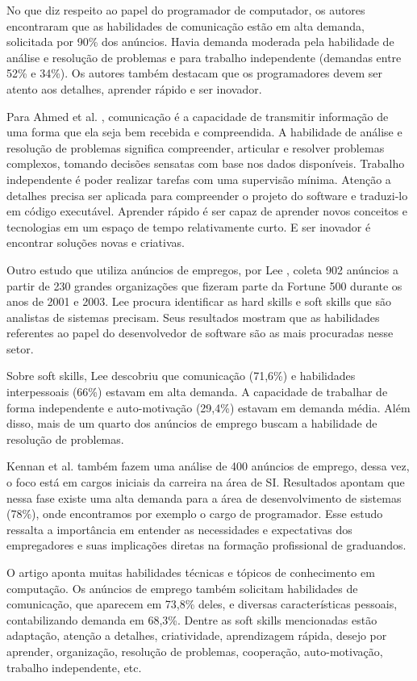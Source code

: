 No que diz respeito ao papel do programador de computador, os autores encontraram que as habilidades de comunicação estão em alta demanda, solicitada por 90\% dos anúncios. Havia demanda moderada pela habilidade de análise e resolução de problemas e para trabalho independente (demandas entre 52\% e 34\%). Os autores também destacam que os programadores devem ser atento aos detalhes, aprender rápido e ser inovador.

Para Ahmed et al. \cite{ahmed:12}, comunicação é a capacidade de transmitir informação de uma forma que ela seja bem recebida e compreendida. A habilidade de análise e resolução de problemas significa compreender, articular e resolver problemas complexos, tomando decisões sensatas com base nos dados disponíveis. Trabalho independente é poder realizar tarefas com uma supervisão mínima. Atenção a detalhes precisa ser aplicada para compreender o projeto do software e traduzi-lo em código executável. Aprender rápido é ser capaz de aprender novos conceitos e tecnologias em um espaço de tempo relativamente curto. E ser inovador é encontrar soluções novas e criativas.

Outro estudo que utiliza anúncios de empregos, por Lee \cite{lee:05}, coleta 902 anúncios a partir de 230 grandes organizações que fizeram parte da Fortune 500 durante os anos de 2001 e 2003. Lee procura identificar as hard skills e soft skills que são analistas de sistemas precisam. Seus resultados mostram que as habilidades referentes ao papel do desenvolvedor de software são as mais procuradas nesse setor.

Sobre soft skills, Lee descobriu que comunicação (71,6\%) e habilidades interpessoais (66\%) estavam em alta demanda. A capacidade de trabalhar de forma independente e auto-motivação (29,4\%) estavam em demanda média. Além disso, mais de um quarto dos anúncios de emprego buscam a habilidade de resolução de problemas.

Kennan et al. \cite{kennan:09} também fazem uma análise de 400 anúncios de emprego, dessa vez, o foco está em cargos iniciais da carreira na área de SI. Resultados apontam que nessa fase existe uma alta demanda para a área de desenvolvimento de sistemas (78\%), onde encontramos por exemplo o cargo de programador. Esse estudo ressalta a importância em entender as necessidades e expectativas dos empregadores e suas implicações diretas na formação profissional de graduandos.

O artigo aponta muitas habilidades técnicas e tópicos de conhecimento em computação. Os anúncios de emprego também solicitam habilidades de comunicação, que aparecem em 73,8\% deles, e diversas características pessoais, contabilizando demanda em 68,3\%. Dentre as soft skills mencionadas estão adaptação, atenção a detalhes, criatividade, aprendizagem rápida, desejo por aprender, organização, resolução de problemas, cooperação, auto-motivação, trabalho independente, etc. 

